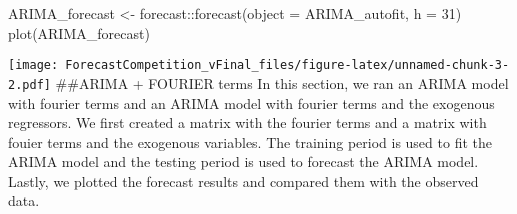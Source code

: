 \documentclass[
]{article}
\newenvironment{Shaded}{\begin{snugshade}}{\end{snugshade}}
\newcommand{\AttributeTok}[1]{\textcolor[rgb]{0.77,0.63,0.00}{#1}}
\newcommand{\DecValTok}[1]{\textcolor[rgb]{0.00,0.00,0.81}{#1}}
\newcommand{\FunctionTok}[1]{\textcolor[rgb]{0.00,0.00,0.00}{#1}}
\newcommand{\NormalTok}[1]{#1}
\newcommand{\OtherTok}[1]{\textcolor[rgb]{0.56,0.35,0.01}{#1}}
\newcommand{\SpecialCharTok}[1]{\textcolor[rgb]{0.00,0.00,0.00}{#1}}
\begin{document}
\begin{Shaded}
\begin{Highlighting}[]
\NormalTok{ARIMA\_forecast }\OtherTok{\textless{}{-}}\NormalTok{ forecast}\SpecialCharTok{::}\FunctionTok{forecast}\NormalTok{(}\AttributeTok{object =}\NormalTok{ ARIMA\_autofit, }\AttributeTok{h =} \DecValTok{31}\NormalTok{)}
\FunctionTok{plot}\NormalTok{(ARIMA\_forecast)}
\end{Highlighting}
\end{Shaded}

\texttt{[image: ForecastCompetition\_vFinal\_files/figure-latex/unnamed-chunk-3-2.pdf]}
\#\#ARIMA + FOURIER terms In this section, we ran an ARIMA model with
fourier terms and an ARIMA model with fourier terms and the exogenous
regressors. We first created a matrix with the fourier terms and a
matrix with fouier terms and the exogenous variables. The training
period is used to fit the ARIMA model and the testing period is used to
forecast the ARIMA model. Lastly, we plotted the forecast results and
compared them with the observed data.
\end{document}
